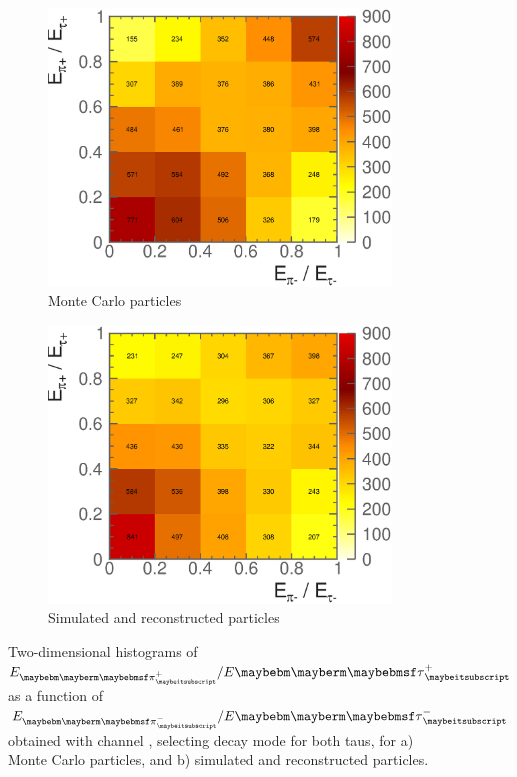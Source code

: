 \begin{figure}[htbp]
\centering %
\begin{subfigure}[b]{0.75\textwidth}
  \includegraphics[width=\textwidth]{tau/NoTimeAnalysis/2DMC}
  \caption{Monte Carlo particles}
  \label{fig:TauSpin2DMC}
\end{subfigure}
\begin{subfigure}[b]{0.75\textwidth}
  \includegraphics[width=\textwidth]{tau/NoTimeAnalysis/2Dreco}
  \caption{Simulated and reconstructed particles}
  \label{fig:TauSpin2Dreco}
\end{subfigure}
\caption
{Two-dimensional histograms of $E_{\Ppiplus}/E{\APtauon}$ as a function of $E_{\Ppiminus}/E{\Ptauon}$ obtained with  \ZToTauTau channel , selecting \tauToPion decay mode for both taus, for a) Monte Carlo particles, and b) simulated and reconstructed particles.}
\label{fig:TauSpin2D}
\end{figure}
